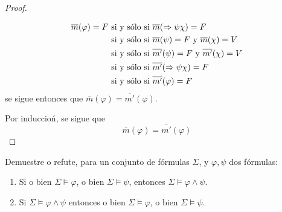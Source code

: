 \documentclass[12pt]{report}
\newcounter{it}
\theoremstyle{largebreak}
\begin{document}
\begin{proof}
\begin{itemize}
\begin{itemize}
                \begin{equation*}
                    \begin{split}
                        \overline{m}(\varphi)=F&\textup{ si y sólo si }\overline{m}(\Rightarrow\psi\chi)=F\\
                        &\textup{ si y sólo si }\overline{m}(\psi)=F\textup{ y }\overline{m}(\chi)=V\\
                        &\textup{ si y sólo si }\overline{m'}(\psi)=F\textup{ y }\overline{m'}(\chi)=V\\
                        &\textup{ si y sólo si }\overline{m'}(\Rightarrow\psi\chi)=F\\
                        &\textup{ si y sólo si }\overline{m'}(\varphi)=F\\
                    \end{split}
                \end{equation*}
                se sigue entonces que $\overline{m}(\varphi)=\overline{m'}(\varphi)$.
            \end{itemize}
        \end{itemize}
        Por induccioń, se sigue que
        \begin{equation*}
            \overline{m}(\varphi)=\overline{m'}(\varphi)
        \end{equation*}
    \end{proof}

    \begin{excer}
        Demuestre o refute, para un conjunto de fórmulas $\Sigma$, y $\varphi,\psi$ dos fórmulas:
        \begin{enumerate}
            \item Si o bien $\Sigma\vDash\varphi$, o bien $\Sigma\vDash\psi$, entonces $\Sigma\vDash\varphi\land\psi$.
            \item Si $\Sigma\vDash\varphi\land\psi$ entonces o bien $\Sigma\vDash\varphi$, o bien $\Sigma\vDash\psi$.
        \end{enumerate}
    \end{excer}
    
\end{document}
